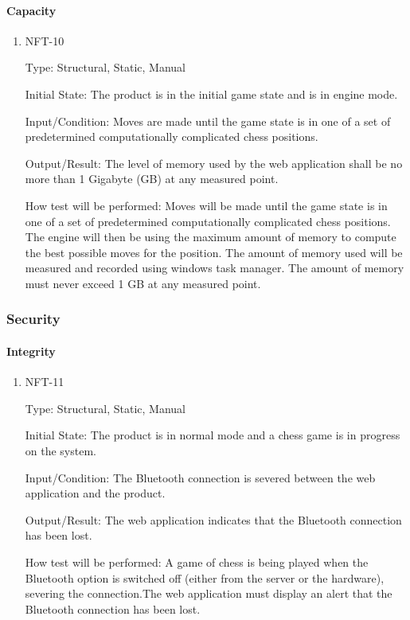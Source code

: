 \documentclass[12pt, titlepage]{article}
\begin{document}
\paragraph{Capacity}
\begin{enumerate}
    \item{NFT-10}

        Type: Structural, Static, Manual
                            
        Initial State: The product is in the initial game state and is in engine mode.
                            
        Input/Condition: Moves are made until the game state is in one of a set of predetermined computationally complicated chess positions.
                            
        Output/Result: The level of memory used by the web application shall be no more than 1 Gigabyte (GB) at any measured point.
                            
        How test will be performed: Moves will be made until the game state is in one of a set of predetermined computationally complicated chess positions. 
            The engine will then be using the maximum amount of memory to compute the best possible moves for the position. The amount of memory used will be 
            measured and recorded using windows task manager. The amount of memory must never exceed 1 GB at any measured point.
\end{enumerate}

\subsubsection{Security}
\paragraph{Integrity}
\begin{enumerate}
    \item{NFT-11}

        Type: Structural, Static, Manual
                            
        Initial State: The product is in normal mode and a chess game is in progress on the system.
                            
        Input/Condition: The Bluetooth connection is severed between the web application and the product.
                            
        Output/Result: The web application indicates that the Bluetooth connection has been lost.
                            
        How test will be performed: A game of chess is being played when the Bluetooth option is switched off (either from the server or the hardware),
        severing the connection.The web application must display an alert that the Bluetooth connection has been lost.
\end{enumerate}
\end{document}
